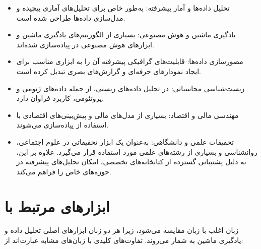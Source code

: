 \documentclass[11pt, a4paper, oneside]{book}
\begin{document}
			\begin{itemize}
				
				\item {\large تحلیل داده‌ها و آمار پیشرفته}: 
				{\normalsize {} به‌طور خاص برای تحلیل‌های آماری پیچیده و مدل‌سازی داده‌ها طراحی شده است.}
				
				\item {\large یادگیری ماشین و هوش مصنوعی}:
				{\normalsize بسیاری از الگوریتم‌های یادگیری ماشین و ابزارهای هوش مصنوعی در  پیاده‌سازی شده‌اند.}
				
				\item {\large مصورسازی داده‌ها}:
				{\normalsize قابلیت‌های گرافیکی پیشرفته  آن را به ابزاری مناسب برای ایجاد نمودارهای حرفه‌ای و گزارش‌های بصری تبدیل کرده است.}
				
				\item {\large زیست‌شناسی محاسباتی}:
				{\normalsize {} در تحلیل داده‌های زیستی، از جمله داده‌های ژنومی و پروتئومی، کاربرد فراوان دارد.}
				
				\item {\large مهندسی مالی و اقتصاد}:
				{\normalsize بسیاری از مدل‌های مالی و پیش‌بینی‌های اقتصادی با استفاده از  پیاده‌سازی می‌شوند.}
				
				\item {\large تحقیقات علمی و دانشگاهی}:
				{\normalsize {} به‌عنوان یک ابزار تحقیقاتی در علوم اجتماعی، روانشناسی و بسیاری از رشته‌های علمی مورد استفاده قرار می‌گیرد.
					علاوه بر این،  به دلیل پشتیبانی گسترده از کتابخانه‌های تخصصی، امکان تحلیل‌های پیشرفته در حوزه‌های خاص را فراهم می‌کند.}
				
			\end{itemize}
		
		
		\section{ابزارهای مرتبط با }
			
			
			زبان  اغلب با زبان  مقایسه می‌شود، زیرا هر دو زبان ابزارهای اصلی تحلیل داده و یادگیری ماشین به شمار می‌روند. تفاوت‌های کلیدی  با زبان‌های مشابه عبارت‌اند از:
			
\end{document}
